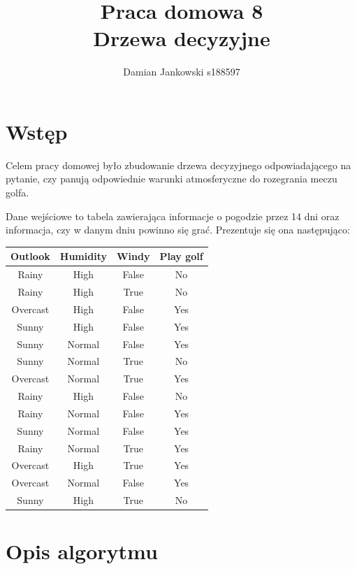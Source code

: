 \documentclass{article}
\title{Praca domowa 8\\Drzewa decyzyjne}
\author{Damian Jankowski s188597}
\begin{document}
\maketitle

\section{Wstęp}

Celem pracy domowej było zbudowanie drzewa decyzyjnego
odpowiadającego na pytanie, czy panują odpowiednie
warunki atmosferyczne do rozegrania meczu golfa.

Dane wejściowe to tabela zawierająca informacje o
pogodzie przez 14 dni oraz informacja, czy w danym
dniu powinno się grać. Prezentuje się ona następująco:

\begin{table}[H]
    \centering
    \begin{tabular}{|c|c|c|c|}
    \hline
    \textbf{Outlook} & \textbf{Humidity} & \textbf{Windy} & \textbf{Play golf} \\
    \hline
    \hline
    Rainy & High & False & No \\
    \hline
    Rainy & High & True & No \\
    \hline
    Overcast & High & False & Yes \\
    \hline
    Sunny & High & False & Yes \\
    \hline
    Sunny & Normal & False & Yes \\
    \hline
    Sunny & Normal & True & No \\
    \hline
    Overcast & Normal & True & Yes \\
    \hline
    Rainy & High & False & No \\
    \hline
    Rainy & Normal & False & Yes \\
    \hline
    Sunny & Normal & False & Yes \\
    \hline
    Rainy & Normal & True & Yes \\
    \hline
    Overcast & High & True & Yes \\
    \hline
    Overcast & Normal & False & Yes \\
    \hline
    Sunny & High & True & No \\
    \hline
    \end{tabular}
\end{table}

\section{Opis algorytmu}
\end{document}
